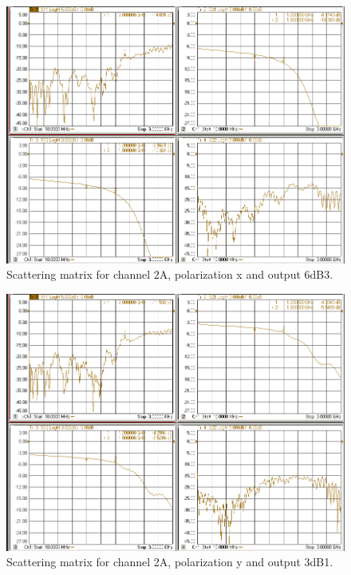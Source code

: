 \documentclass[12pt,a4paper,oneside]{article}
\begin{document}
\begin{figure}[H]
\centering
\includegraphics[width=0.9\linewidth]{VNA_results/2Ax_6dB3.png}
\caption{Scattering matrix for channel 2A, polarization x and output 6dB3.}
\label{fig:2Ax_6dB3}
\end{figure}


\begin{figure}[H]
\centering
\includegraphics[width=0.9\linewidth]{VNA_results/2Ay_3dB1.png}
\caption{Scattering matrix for channel 2A, polarization y and output 3dB1.}
\label{fig:2Ay_3dB1}
\end{figure}
\end{document}

